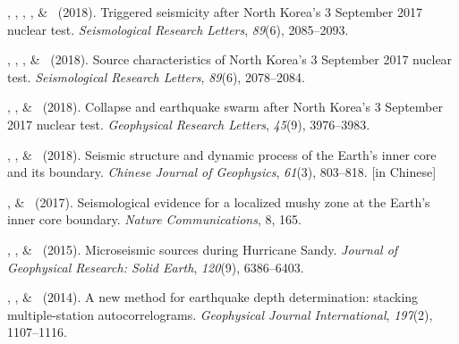 \begin{etaremune}
\item
    \JYao\CF\CS, \Me\CF, \ZLu, \LSun, \& \LWen\ (2018).
    Triggered seismicity after North Korea's 3 September 2017 nuclear test.
    \emph{Seismological Research Letters}, \emph{89}(6), 2085--2093.
\item
    \JYao\CF\CS, \Me\CF, \LSun, \& \LWen\ (2018).
    Source characteristics of North Korea's 3 September 2017 nuclear test.
    \emph{Seismological Research Letters}, \emph{89}(6), 2078--2084.
\item
    \Me\CF\CS, \JYao\CF, \& \LWen\ (2018).
    Collapse and earthquake swarm after North Korea's 3 September 2017 nuclear test.
    \emph{Geophysical Research Letters}, \emph{45}(9), 3976--3983.
\item
    \LWen\CS, \Me, \& \JYao\ (2018).
    Seismic structure and dynamic process of the Earth's inner core and its boundary.
    \emph{Chinese Journal of Geophysics}, \emph{61}(3), 803--818.
     [in Chinese]
\item
    \Me, \& \LWen\CS\ (2017).
    Seismological evidence for a localized mushy zone at the Earth's inner core boundary.
    \emph{Nature Communications}, 8, 165.
\item
    \XChen\CS, \Me, \& \LWen\ (2015).
    Microseismic sources during Hurricane Sandy.
    \emph{Journal of Geophysical Research: Solid Earth}, \emph{120}(9), 6386--6403.
\item \MZhang\CS, \Me, \& \LWen\ (2014).
    A new method for earthquake depth determination: stacking multiple-station autocorrelograms.
    \emph{Geophysical Journal International}, \emph{197}(2), 1107--1116.
\end{etaremune}

